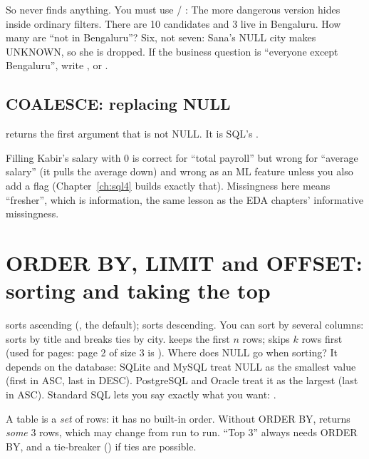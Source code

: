So  never finds anything. You must use  / :
The more dangerous version hides inside ordinary filters. There are 10 candidates and 3 live in Bengaluru. How many are ``not in Bengaluru''?
Six, not seven: Sana's NULL city makes  UNKNOWN, so she is dropped. If the business question is ``everyone except Bengaluru'',
write , or .

\subsection{COALESCE: replacing NULL}
 returns the first argument that is not NULL. It is SQL's .
\begin{practical}
Filling Kabir's salary with 0 is correct for ``total payroll'' but wrong for ``average salary'' (it pulls the average down) and wrong as an ML feature
unless you also add a flag  (Chapter~\ref{ch:sql4} builds exactly that). Missingness here means ``fresher'', which is information,
the same lesson as the EDA chapters' informative missingness.
\end{practical}

\section{ORDER BY, LIMIT and OFFSET: sorting and taking the top}
 sorts ascending (, the default);  sorts descending. You can sort by several columns:
 sorts by title and breaks ties by city.  keeps the first $n$ rows;  skips $k$ rows first (used
for pages: page 2 of size 3 is ).
Where does NULL go when sorting? It depends on the database:
SQLite and MySQL treat NULL as the smallest value (first in ASC, last in DESC). PostgreSQL and Oracle treat it as the largest (last in ASC). Standard SQL
lets you say exactly what you want: .

\begin{trap}
A table is a \emph{set} of rows: it has no built-in order. Without ORDER BY,  returns \emph{some} 3 rows, which may change from run to run.
``Top 3'' always needs ORDER BY, and a tie-breaker () if ties are possible.
\end{trap}

